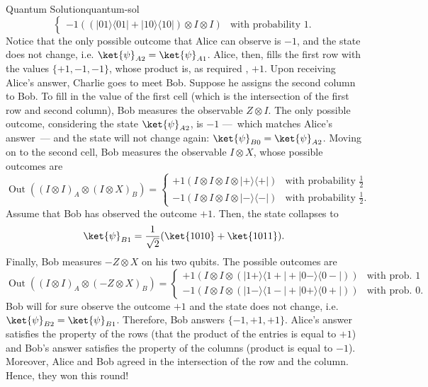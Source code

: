 \documentclass{llncs}
\newcommand{\ketbra}[2]{\ensuremath{| #1 \rangle \langle #2 |}}
\begin{document}
\begin{tcbexample}{Quantum Solution}{quantum-sol}
\begin{equation}
\begin{cases}
      -1 \left(\left(\ketbra{01}{01} + \ketbra{10}{10}\right) \otimes I \otimes I\right)
      &\text{with probability } 1.
    \end{cases}
  \end{equation}
  Notice that the only possible outcome that Alice can observe is
  \(-1\), and the state does not change, i.e.
  \(\ket{\psi}_{A2} = \ket{\psi}_{A1}\).  Alice, then, fills the first
  row with the values \(\{+1, -1, -1\}\), whose product is, as
  required
  , \(+1\). Upon receiving Alice's answer, Charlie goes to
  meet Bob. Suppose he assigns the second column to Bob. To fill in
  the value of the first cell (which is the intersection of the first
  row and second column), Bob measures the observable \(Z \otimes
  I\). The only possible outcome, considering the state
  \(\ket{\psi}_{A2}\), is \(-1\) ---~which matches Alice's answer~---
  and the state will not change again:
  \(\ket{\psi}_{B0} = \ket{\psi}_{A2}\). Moving on to the second cell,
  Bob measures the observable \(I \otimes X\), whose possible outcomes
  are
  \begin{equation}
    \operatorname{Out}((I \otimes I)_{A} \otimes (I \otimes X)_{B}) =
    \begin{cases}
      +1 \left(I \otimes I \otimes I \otimes \ketbra{+}{+}\right)
      &\text{with probability } \frac{1}{2} \\
      -1 \left(I \otimes I \otimes I \otimes \ketbra{-}{-}\right)
      &\text{with probability } \frac{1}{2}.
    \end{cases}
  \end{equation}
  Assume that Bob has observed the outcome \(+1\). Then, the state
  collapses to
  \begin{equation}
    \ket{\psi}_{B1} =  \frac{1}{\sqrt{2}}(\ket{1010} + \ket{1011}).
  \end{equation}
  Finally, Bob measures \(-Z \otimes X\) on his two qubits.
  The possible outcomes are
  \begin{equation}
    \operatorname{Out}((I \otimes I)_{A} \otimes (-Z \otimes X)_{B}) =
    \begin{cases}
      +1 \left(I \otimes I \otimes \left(\ketbra{1+}{1\!+\!} + \ketbra{0-}{0\!-\!}\right)\right)
      &\text{with prob. } 1 \\
      -1 \left(I \otimes I \otimes \left(\ketbra{1-}{1\!-\!} + \ketbra{0+}{0\!+\!}\right)\right)
      &\text{with prob. } 0.
    \end{cases}
  \end{equation}
  Bob will for sure observe the outcome \(+1\) and the state does not
 change, i.e.  \(\ket{\psi}_{B2} = \ket{\psi}_{B1}\). Therefore, Bob
  answers \(\{-1, +1, +1\}\). Alice's answer satisfies the property of
  the rows (that the product of the entries is equal to \(+1\)) and
  Bob's answer satisfies the property of the columns (product is equal
  to \(-1\)).  Moreover, Alice and Bob agreed in the intersection of
  the row and the column.  Hence, they won this round!
\end{tcbexample}
\end{document}
